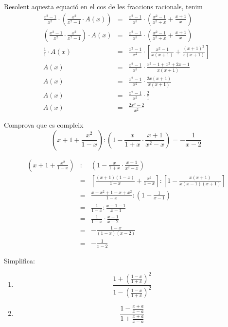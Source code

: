 \begin{solucio}
Resolent aquesta equació en el cos de les fraccions racionals,
tenim\begin{eqnarray*}
\frac{x^{2}-1}{x^{2}}\cdot \left( \frac{x^{2}}{x^{2}-1}\cdot A(x)\right) &=&\frac{x^{2}-1}{x^{2}}\cdot \left( \frac{x^{2}-1}{x^{2}+x}+\frac{x+1}{x}\right) \\
\left( \frac{x^{2}-1}{x^{2}}\cdot \frac{x^{2}}{x^{2}-1}\right) \cdot A(x) &=&\frac{x^{2}-1}{x^{2}}\cdot \left( \frac{x^{2}-1}{x^{2}+x}+\frac{x+1}{x}\right) \\
\frac{1}{1}\cdot A(x) &=&\frac{x^{2}-1}{x^{2}}\cdot \left[ \frac{x^{2}-1}{x(x+1)}+\frac{(x+1)^{2}}{x(x+1)}\right] \\
A(x) &=&\frac{x^{2}-1}{x^{2}}\cdot \frac{x^{2}-1+x^{2}+2x+1}{x(x+1)} \\
A(x) &=&\frac{x^{2}-1}{x^{2}}\cdot \frac{2x(x+1)}{x(x+1)} \\
A(x) &=&\frac{x^{2}-1}{x^{2}}\cdot \frac{2}{1} \\
A(x) &=&\frac{2x^{2}-2}{x^{2}}
\end{eqnarray*}
\end{solucio}

\begin{exercici}
Comprova que es compleix\[
\left( x+1+\frac{x^{2}}{1-x}\right):\left( 1-\frac{x}{1+x}\cdot \frac{x+1}{x^{2}-x}\right) =-\frac{1}{x-2}
\]
\end{exercici}

\begin{solucio}
\begin{eqnarray*}
\left( x+1+\frac{x^{2}}{1-x}\right) &:&\left( 1-\frac{x}{1+x}\cdot \frac{x+1}{x^{2}-x}\right) \\
&=&\left[ \frac{(x+1)(1-x)}{1-x}+\frac{x^{2}}{1-x}\right]:\left[ 1-\frac{x(x+1)}{x(x-1)(x+1)}\right] \\
&=&\frac{x-x^{2}+1-x+x^{2}}{1-x}:\left( 1-\frac{1}{x-1}\right) \\
&=&\frac{1}{1-x}:\frac{x-1-1}{x-1} \\
&=&\frac{1}{1-x}\cdot \frac{x-1}{x-2} \\
&=&-\frac{1-x}{(1-x)(x-2)} \\
&=&-\frac{1}{x-2}
\end{eqnarray*}
\end{solucio}

\begin{exercici}
Simplifica:

\begin{enumerate}
\item[a)]
\[
\frac{1+\left( \frac{1-x}{1+x}\right) ^{2}}{1-\left( \frac{1-x}{1+x}\right)
^{2}}
\]

\item[b)]
\[
\frac{1-\frac{x+a}{x-a}}{1+\frac{x+a}{x-a}}
\]
\end{enumerate}
\end{exercici}

